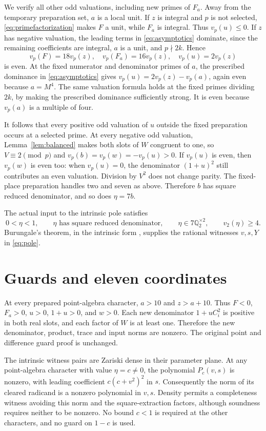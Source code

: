 \documentclass[11pt,a4paper]{article}
\newcommand{\Q}{\mathbb Q}\newcommand{\Z}{\mathbb Z}
\begin{document}
We verify all other odd valuations, including new primes of $F_a$.
Away from the temporary preparation set, $a$ is a local unit.
If $z$ is integral and $p$ is not selected, \eqref{eq:primefactorization}
makes $F$ a unit, while $F_a$ is integral. Thus $v_p(u)\le0$.
If $z$ has negative valuation, the leading terms in
\eqref{eq:asymptotics} dominate, since the remaining coefficients are
integral, $a$ is a unit, and $p\nmid 2k$. Hence
\[
 v_p(F)=18v_p(z),\quad v_p(F_a)=16v_p(z),\quad
                         v_p(u)=2v_p(z)
\]
is even. At the fixed numerator and denominator primes of $a$, the
prescribed dominance in \eqref{eq:asymptotics} gives
$v_p(u)=2v_p(z)-v_p(a)$, again even because $a=M^4$. The same valuation formula holds at the fixed primes dividing $2k$,
by making the prescribed dominance sufficiently strong. It is even
because $v_p(a)$ is a multiple of four.

It follows that every positive odd valuation of $u$ outside the fixed
preparation occurs at a selected prime. At every negative odd valuation,
Lemma~\ref{lem:balanced} makes both slots of $W$ congruent to one,
so $V\equiv2\pmod p$ and
$v_p(b)=v_p(w)=-v_p(u)>0$.
If $v_p(u)$ is even, then $v_p(w)$ is even too: when $v_p(u)=0$,
the denominator $(1+u)^2$ still contributes an even valuation.
Division by $V^2$ does not change parity. The fixed-place preparation
handles two and seven as above. Therefore $b$ has square reduced
denominator, and so does $\eta=7b$.

The actual input to the intrinsic pole satisfies
\[
 0<\eta<1,\qquad \eta\text{ has square reduced denominator},\qquad
 \eta\in7\Q_2^{\times2},\qquad v_2(\eta)\ge4.
\]
Burungale's theorem, in the intrinsic form \cite{Intrinsic}, supplies
the rational witnesses $v,s,Y$ in \eqref{eq:pole}.

\section{Guards and eleven coordinates}

At every prepared point-algebra character, $a>10$ and $z>a+10$.
Thus $F<0$, $F_a>0$, $u>0$, $1+u>0$, and $w>0$.
Each new denominator $1+uC_i^2$ is positive in both real slots,
and each factor of $W$ is at least one. Therefore the new denominator,
product, trace and input norms are nonzero. The original point and
difference guard proof is unchanged.

The intrinsic witness pairs are Zariski dense in their parameter plane.
At any point-algebra character with value $\eta=c\ne0$, the
polynomial $P_c(v,s)$ is nonzero, with leading coefficient
$c(c+v^2)^2$ in $s$. Consequently the norm of its cleared radicand
is a nonzero polynomial in $v,s$. Density permits a completeness
witness avoiding this norm and the square-extraction factors, although
soundness requires neither to be nonzero. No bound $c<1$ is required
at the other characters, and no guard on $1-c$ is used.
\end{document}
